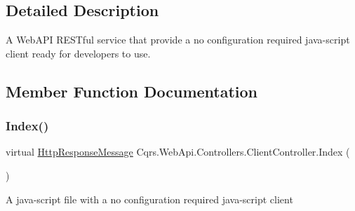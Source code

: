 \subsection{Detailed Description}
A Web\+A\+PI R\+E\+S\+Tful service that provide a \textquotesingle{}no configuration required\textquotesingle{} java-\/script client ready for developers to use. 



\subsection{Member Function Documentation}
\mbox{\label{classCqrs_1_1WebApi_1_1Controllers_1_1ClientController_abcd1d9049d9e3cee06558ccf055639f3_abcd1d9049d9e3cee06558ccf055639f3}} 
\subsubsection{\texorpdfstring{Index()}{Index()}}
{\footnotesize\ttfamily virtual \hyperlink{classCqrs_1_1WebApi_1_1HttpResponseMessage}{Http\+Response\+Message} Cqrs.\+Web\+Api.\+Controllers.\+Client\+Controller.\+Index (\begin{DoxyParamCaption}{ }\end{DoxyParamCaption})\hspace{0.3cm}{\ttfamily [virtual]}}



A java-\/script file with a \textquotesingle{}no configuration required\textquotesingle{} java-\/script client 

